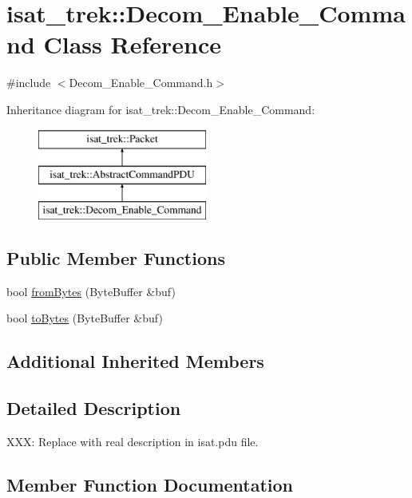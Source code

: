 \hypertarget{classisat__trek_1_1_decom___enable___command}{}\section{isat\+\_\+trek\+:\+:Decom\+\_\+\+Enable\+\_\+\+Command Class Reference}
\label{classisat__trek_1_1_decom___enable___command}


{\ttfamily \#include $<$Decom\+\_\+\+Enable\+\_\+\+Command.\+h$>$}

Inheritance diagram for isat\+\_\+trek\+:\+:Decom\+\_\+\+Enable\+\_\+\+Command\+:\begin{figure}[H]
\begin{center}
\leavevmode
\includegraphics[height=3.000000cm]{classisat__trek_1_1_decom___enable___command}
\end{center}
\end{figure}
\subsection*{Public Member Functions}
\begin{DoxyCompactItemize}
\item 
bool \hyperlink{classisat__trek_1_1_decom___enable___command_a5e1c160cf9cd7f385b1bcb149c7663e4}{from\+Bytes} (Byte\+Buffer \&buf)
\item 
bool \hyperlink{classisat__trek_1_1_decom___enable___command_acf7e7fd30cd0fe89ceac444909baf115}{to\+Bytes} (Byte\+Buffer \&buf)
\end{DoxyCompactItemize}
\subsection*{Additional Inherited Members}


\subsection{Detailed Description}
X\+XX\+: Replace with real description in isat.\+pdu file. 

\subsection{Member Function Documentation}
